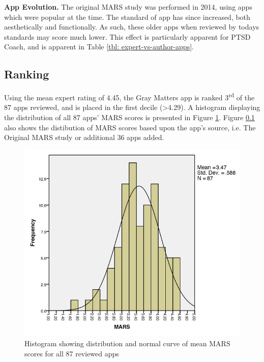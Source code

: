 \textbf{App Evolution.}
The original MARS study was performed in 2014, using apps which were popular at the time. The standard of app has since increased, both aesthetically and functionally. As such, these older apps when reviewed by todays standards may score much lower. This effect is particularly apparent for PTSD Coach, and is apparent in Table \ref{tbl: expert-vs-author-apps}. 

\subsection{Ranking}
Using the mean expert rating of 4.45, the Gray Matters app is ranked 3\textsuperscript{rd} of the 87 apps reviewed, and is placed in the first decile (\textgreater 4.29). A histogram displaying the distribution of all 87 apps' MARS scores is presented in Figure \ref{fig: allapps-histogram}. Figure \ref{} also shows the distibution of MARS scores based upon the app's source, i.e. The Original MARS study or additional 36 apps added.

\begin{figure}[h]
    \centering
    \includegraphics[scale=0.4, angle=0]{Files/prevention-study-2/figures/allapps-histogram}
    \caption{Histogram showing distribution and normal curve of mean MARS scores for all 87 reviewed apps}
    \label{fig: allapps-histogram}
\end{figure}

